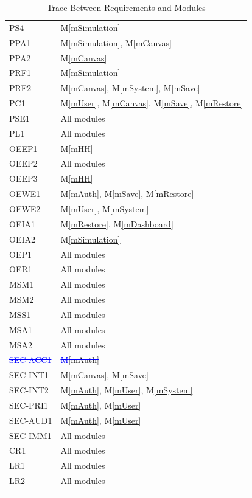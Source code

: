 \documentclass[12pt, titlepage]{article}
\newcommand{\mref}[1]{M\ref{#1}}
\begin{document}
\begin{longtable}{p{} p{}}
PS4 & \mref{mSimulation}\\
PPA1 & \mref{mSimulation}, \mref{mCanvas}\\
PPA2 & \mref{mCanvas}\\
PRF1 & \mref{mSimulation}\\
PRF2 & \mref{mCanvas}, \mref{mSystem}, \mref{mSave} \\
PC1 & \mref{mUser}, \mref{mCanvas}, \mref{mSave}, \mref{mRestore}\\
PSE1 & All modules\\
PL1 & All modules\\
OEEP1 & \mref{mHH}\\
OEEP2 & All modules\\
OEEP3 & \mref{mHH}\\
OEWE1 & \mref{mAuth}, \mref{mSave}, \mref{mRestore}\\
OEWE2 & \mref{mUser}, \mref{mSystem}\\
OEIA1 & \mref{mRestore}, \mref{mDashboard}\\
OEIA2 & \mref{mSimulation}\\
OEP1 & All modules\\
OER1 & All modules\\
MSM1 & All modules\\
MSM2 & All modules\\
MSS1 & All modules\\
MSA1 & All modules\\
MSA2 & All modules\\
\textcolor{blue}{\sout{SEC-ACC1}} & \textcolor{blue}{\sout{\mref{mAuth}}}\\
SEC-INT1 & \mref{mCanvas}, \mref{mSave}\\
SEC-INT2 & \mref{mAuth}, \mref{mUser}, \mref{mSystem}\\
SEC-PRI1 & \mref{mAuth}, \mref{mUser}\\
SEC-AUD1 & \mref{mAuth}, \mref{mUser}\\
SEC-IMM1 & All modules\\
CR1 & All modules\\
LR1 & All modules\\
LR2 & All modules\\


\caption{Trace Between Requirements and Modules}
\label{TblRT}
\end{longtable}
\end{document}
